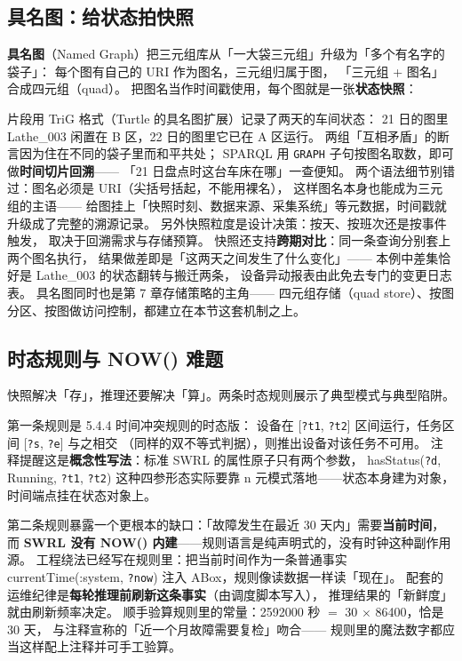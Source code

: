 \subsection{具名图：给状态拍快照}

\textbf{具名图}（Named Graph）把三元组库从「一大袋三元组」升级为「多个有名字的袋子」：
每个图有自己的 URI 作为图名，三元组归属于图，
「三元组 + 图名」合成四元组（quad）。
把图名当作时间戳使用，每个图就是一张\textbf{状态快照}：



片段用 TriG 格式（Turtle 的具名图扩展）记录了两天的车间状态：
21 日的图里 Lathe\_003 闲置在 B 区，22 日的图里它已在 A 区运行。
两组「互相矛盾」的断言因为住在不同的袋子里而和平共处；
SPARQL 用 \texttt{GRAPH} 子句按图名取数，即可做\textbf{时间切片回溯}——
「21 日盘点时这台车床在哪」一查便知。
两个语法细节别错过：图名必须是 URI（尖括号括起，不能用裸名），
这样图名本身也能成为三元组的主语——
给图挂上「快照时刻、数据来源、采集系统」等元数据，时间戳就升级成了完整的溯源记录。
另外快照粒度是设计决策：按天、按班次还是按事件触发，
取决于回溯需求与存储预算。
快照还支持\textbf{跨期对比}：同一条查询分别套上两个图名执行，
结果做差即是「这两天之间发生了什么变化」——
本例中差集恰好是 Lathe\_003 的状态翻转与搬迁两条，
设备异动报表由此免去专门的变更日志表。
具名图同时也是第 7 章存储策略的主角——
四元组存储（quad store）、按图分区、按图做访问控制，都建立在本节这套机制之上。

\subsection{时态规则与 NOW() 难题}

快照解决「存」，推理还要解决「算」。两条时态规则展示了典型模式与典型陷阱。



第一条规则是 5.4.4 时间冲突规则的时态版：
设备在 [\texttt{?t1}, \texttt{?t2}] 区间运行，任务区间 [\texttt{?s}, \texttt{?e}] 与之相交
（同样的双不等式判据），则推出设备对该任务不可用。
注释提醒这是\textbf{概念性写法}：标准 SWRL 的属性原子只有两个参数，
hasStatus(\texttt{?d}, Running, \texttt{?t1}, \texttt{?t2}) 这种四参形态实际要靠
n 元模式落地——状态本身建为对象，时间端点挂在状态对象上。

第二条规则暴露一个更根本的缺口：「故障发生在最近 30 天内」需要\textbf{当前时间}，
而 \textbf{SWRL 没有 NOW() 内建}——规则语言是纯声明式的，没有时钟这种副作用源。
工程绕法已经写在规则里：把当前时间作为一条普通事实
currentTime(:system, \texttt{?now}) 注入 ABox，规则像读数据一样读「现在」。
配套的运维纪律是\textbf{每轮推理前刷新这条事实}（由调度脚本写入），
推理结果的「新鲜度」就由刷新频率决定。
顺手验算规则里的常量：2592000 秒 \(=\) 30 \(\times\) 86400，恰是 30 天，
与注释宣称的「近一个月故障需要复检」吻合——
规则里的魔法数字都应当这样配上注释并可手工验算。

